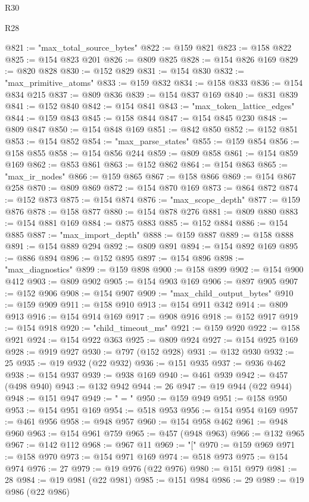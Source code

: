 \begin{lexlean}{R30}
\begin{lexlean}{R28}
\begin{coremodule}
{{{{{{{{{{{{{{{{{{{{{{{{{{{{{{{{{{{{{{{{{{{{{{{{{{{{{{{{{{{{{{{{{{{{{{{{{{{{{{{{{{{{{{{{{{{{{{{{{{{{{{{{{{{{{{{{{{{{{{{{{{{{{{{{{{{{{{{{{{{{{{{@821 := "max_total_source_bytes"
@822 := @159 @821
@823 := @158 @822
@825 := @154 @823 @201
@826 := @809 @825
@828 := @154 @826 @169
@829 := @820 @828
@830 := @152 @829
@831 := @154 @830
@832 := "max_primitive_atoms"
@833 := @159 @832
@834 := @158 @833
@836 := @154 @834 @215
@837 := @809 @836
@839 := @154 @837 @169
@840 := @831 @839
@841 := @152 @840
@842 := @154 @841
@843 := "max_token_lattice_edges"
@844 := @159 @843
@845 := @158 @844
@847 := @154 @845 @230
@848 := @809 @847
@850 := @154 @848 @169
@851 := @842 @850
@852 := @152 @851
@853 := @154 @852
@854 := "max_parse_states"
@855 := @159 @854
@856 := @158 @855
@858 := @154 @856 @244
@859 := @809 @858
@861 := @154 @859 @169
@862 := @853 @861
@863 := @152 @862
@864 := @154 @863
@865 := "max_ir_nodes"
@866 := @159 @865
@867 := @158 @866
@869 := @154 @867 @258
@870 := @809 @869
@872 := @154 @870 @169
@873 := @864 @872
@874 := @152 @873
@875 := @154 @874
@876 := "max_scope_depth"
@877 := @159 @876
@878 := @158 @877
@880 := @154 @878 @276
@881 := @809 @880
@883 := @154 @881 @169
@884 := @875 @883
@885 := @152 @884
@886 := @154 @885
@887 := "max_import_depth"
@888 := @159 @887
@889 := @158 @888
@891 := @154 @889 @294
@892 := @809 @891
@894 := @154 @892 @169
@895 := @886 @894
@896 := @152 @895
@897 := @154 @896
@898 := "max_diagnostics"
@899 := @159 @898
@900 := @158 @899
@902 := @154 @900 @412
@903 := @809 @902
@905 := @154 @903 @169
@906 := @897 @905
@907 := @152 @906
@908 := @154 @907
@909 := "max_child_output_bytes"
@910 := @159 @909
@911 := @158 @910
@913 := @154 @911 @342
@914 := @809 @913
@916 := @154 @914 @169
@917 := @908 @916
@918 := @152 @917
@919 := @154 @918
@920 := "child_timeout_ms"
@921 := @159 @920
@922 := @158 @921
@924 := @154 @922 @363
@925 := @809 @924
@927 := @154 @925 @169
@928 := @919 @927
@930 := @797 (@152 @928)
@931 := @132 @930
@932 := 25
@935 := @19 @932 (@22 @932)
@936 := @151 @935
@937 := @936 @462
@938 := @154 @937
@939 := @938 @169
@940 := @461 @939
@942 := @457 (@498 @940)
@943 := @132 @942
@944 := 26
@947 := @19 @944 (@22 @944)
@948 := @151 @947
@949 := " = "
@950 := @159 @949
@951 := @158 @950
@953 := @154 @951 @169
@954 := @518 @953
@956 := @154 @954 @169
@957 := @461 @956
@958 := @948 @957
@960 := @154 @958 @462
@961 := @948 @960
@963 := @154 @961 @759
@965 := @457 (@948 @963)
@966 := @132 @965
@967 := @142 @112
@968 := @967 @11
@969 := "["
@970 := @159 @969
@971 := @158 @970
@973 := @154 @971 @169
@974 := @518 @973
@975 := @154 @974
@976 := 27
@979 := @19 @976 (@22 @976)
@980 := @151 @979
@981 := 28
@984 := @19 @981 (@22 @981)
@985 := @151 @984
@986 := 29
@989 := @19 @986 (@22 @986)
}}}}}}}}}}}}}}}}}}}}}}}}}}}}}}}}}}}}}}}}}}}}}}}}}}}}}}}}}}}}}}}}}}}}}}}}}}}}}}}}}}}}}}}}}}}}}}}}}}}}}}}}}}}}}}}}}}}}}}}}}}}}}}}}}}}}}}}}}}}}}}}
\end{coremodule}
\end{lexlean}
\end{lexlean}
